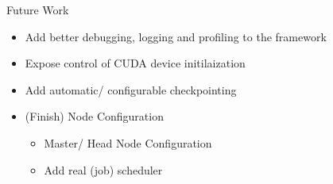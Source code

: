 \begin{block}{\Large Future Work}
\begin{itemize}
\item{Add better debugging, logging and profiling to the framework}
\item{Expose control of CUDA device initilaization}
\item{Add automatic/ configurable checkpointing}
\item{(Finish) Node Configuration}
\begin{itemize}
\item{Master/ Head Node Configuration}
\item{Add real (job) scheduler}
\end{itemize}
\end{itemize}
\end{block}
